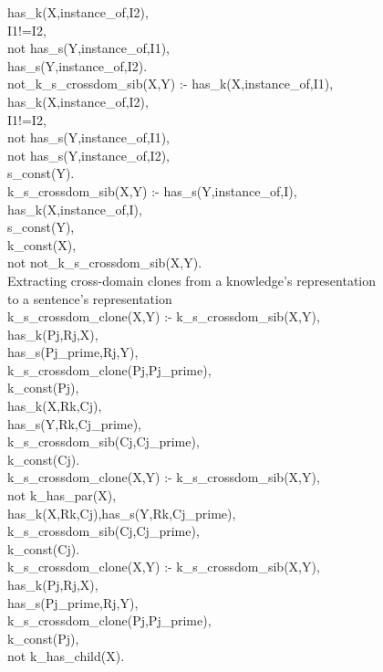 has\_k(X,instance\_of,I2),\\
I1!=I2,\\
not has\_s(Y,instance\_of,I1),\\
has\_s(Y,instance\_of,I2).\\
not\_k\_s\_crossdom\_sib(X,Y) :- has\_k(X,instance\_of,I1),\\
has\_k(X,instance\_of,I2),\\
I1!=I2,\\
not has\_s(Y,instance\_of,I1),\\
not has\_s(Y,instance\_of,I2),\\
s\_const(Y).\\
k\_s\_crossdom\_sib(X,Y) :- has\_s(Y,instance\_of,I),\\
has\_k(X,instance\_of,I),\\
s\_const(Y),\\
k\_const(X),\\
not not\_k\_s\_crossdom\_sib(X,Y).\\
Extracting cross-domain clones from a knowledge’s representation\\
to a sentence’s representation\\
k\_s\_crossdom\_clone(X,Y) :- k\_s\_crossdom\_sib(X,Y),\\
has\_k(Pj,Rj,X),\\
has\_s(Pj\_prime,Rj,Y),\\
k\_s\_crossdom\_clone(Pj,Pj\_prime),\\
k\_const(Pj),\\
has\_k(X,Rk,Cj),\\
has\_s(Y,Rk,Cj\_prime),\\
k\_s\_crossdom\_sib(Cj,Cj\_prime),\\
k\_const(Cj).\\
k\_s\_crossdom\_clone(X,Y) :- k\_s\_crossdom\_sib(X,Y),\\
not k\_has\_par(X),\\
has\_k(X,Rk,Cj),has\_s(Y,Rk,Cj\_prime),\\
k\_s\_crossdom\_sib(Cj,Cj\_prime),\\
k\_const(Cj).\\
k\_s\_crossdom\_clone(X,Y) :- k\_s\_crossdom\_sib(X,Y),\\
has\_k(Pj,Rj,X),\\
has\_s(Pj\_prime,Rj,Y),\\
k\_s\_crossdom\_clone(Pj,Pj\_prime),\\
k\_const(Pj),\\
not k\_has\_child(X).\\
